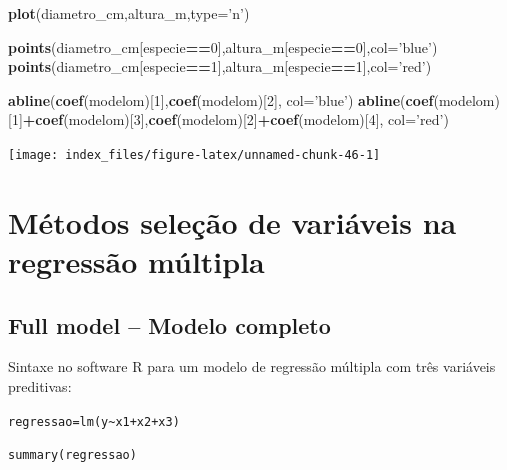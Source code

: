 \documentclass[12pt,brazil,oneside]{book}
\newenvironment{Shaded}{\begin{snugshade}}{\end{snugshade}}
\newcommand{\DataTypeTok}[1]{\textcolor[rgb]{0.13,0.29,0.53}{#1}}
\newcommand{\DecValTok}[1]{\textcolor[rgb]{0.00,0.00,0.81}{#1}}
\newcommand{\KeywordTok}[1]{\textcolor[rgb]{0.13,0.29,0.53}{\textbf{#1}}}
\newcommand{\NormalTok}[1]{#1}
\newcommand{\OperatorTok}[1]{\textcolor[rgb]{0.81,0.36,0.00}{\textbf{#1}}}
\newcommand{\StringTok}[1]{\textcolor[rgb]{0.31,0.60,0.02}{#1}}
\begin{document}
\begin{Shaded}
\begin{Highlighting}[]
\KeywordTok{plot}\NormalTok{(diametro_cm,altura_m,}\DataTypeTok{type=}\StringTok{'n'}\NormalTok{)}

\KeywordTok{points}\NormalTok{(diametro_cm[especie}\OperatorTok{==}\DecValTok{0}\NormalTok{],altura_m[especie}\OperatorTok{==}\DecValTok{0}\NormalTok{],}\DataTypeTok{col=}\StringTok{'blue'}\NormalTok{)}
\KeywordTok{points}\NormalTok{(diametro_cm[especie}\OperatorTok{==}\DecValTok{1}\NormalTok{],altura_m[especie}\OperatorTok{==}\DecValTok{1}\NormalTok{],}\DataTypeTok{col=}\StringTok{'red'}\NormalTok{)}

\KeywordTok{abline}\NormalTok{(}\KeywordTok{coef}\NormalTok{(modelom)[}\DecValTok{1}\NormalTok{],}\KeywordTok{coef}\NormalTok{(modelom)[}\DecValTok{2}\NormalTok{], }\DataTypeTok{col=}\StringTok{'blue'}\NormalTok{)}
\KeywordTok{abline}\NormalTok{(}\KeywordTok{coef}\NormalTok{(modelom)[}\DecValTok{1}\NormalTok{]}\OperatorTok{+}\KeywordTok{coef}\NormalTok{(modelom)[}\DecValTok{3}\NormalTok{],}\KeywordTok{coef}\NormalTok{(modelom)[}\DecValTok{2}\NormalTok{]}\OperatorTok{+}\KeywordTok{coef}\NormalTok{(modelom)[}\DecValTok{4}\NormalTok{], }\DataTypeTok{col=}\StringTok{'red'}\NormalTok{)}
\end{Highlighting}
\end{Shaded}

\begin{center}\texttt{[image: index\_files/figure-latex/unnamed-chunk-46-1]} \end{center}

\hypertarget{metodos-selecao-de-variaveis-na-regressao-multipla}{%
\section{Métodos seleção de variáveis na regressão múltipla}\label{metodos-selecao-de-variaveis-na-regressao-multipla}}

\hypertarget{full-model-modelo-completo}{%
\subsection{Full model -- Modelo completo}\label{full-model-modelo-completo}}

Sintaxe no software R para um modelo de regressão múltipla com três variáveis preditivas:

\texttt{regressao=lm(y\textasciitilde{}x1+x2+x3)}

\texttt{summary(regressao)}
\end{document}
